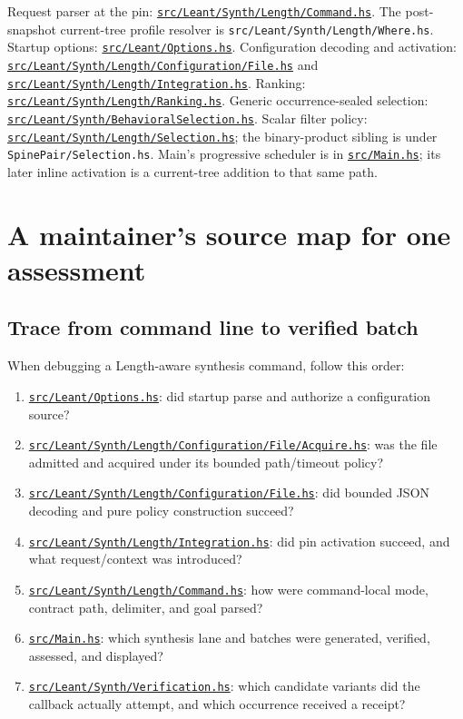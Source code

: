 \documentclass[10pt,letterpaper,oneside]{report}
\newcommand{\code}[1]{\texttt{\detokenize{#1}}}
\newcommand{\filepath}[1]{\nolinkurl{#1}}
\def\LeantCommit{494259dbd85ae2e6749246b08377f44b2f9936ac}
\def\LeantBase{https://github.com/VladimirReshetnikov/Leant/blob/\LeantCommit/}
\newcommand{\lpath}[1]{\href{\LeantBase#1}{\nolinkurl{#1}}}
\begin{document}
\begin{sourcebox}
Request parser at the pin: \lpath{src/Leant/Synth/Length/Command.hs}. The
post-snapshot current-tree profile resolver is
\filepath{src/Leant/Synth/Length/Where.hs}. Startup options:
\lpath{src/Leant/Options.hs}. Configuration decoding and activation:
\lpath{src/Leant/Synth/Length/Configuration/File.hs} and
\lpath{src/Leant/Synth/Length/Integration.hs}. Ranking:
\lpath{src/Leant/Synth/Length/Ranking.hs}. Generic occurrence-sealed selection:
\lpath{src/Leant/Synth/BehavioralSelection.hs}. Scalar filter policy:
\lpath{src/Leant/Synth/Length/Selection.hs}; the binary-product sibling is
under \filepath{SpinePair/Selection.hs}. Main's progressive scheduler is in
\lpath{src/Main.hs}; its later inline activation is a current-tree addition to
that same path.
\end{sourcebox}

\chapter{A maintainer's source map for one assessment}
\label{chap:current-source-map}

\section{Trace from command line to verified batch}

When debugging a Length-aware synthesis command, follow this order:

\begin{enumerate}
\item \lpath{src/Leant/Options.hs}: did startup parse and authorize a configuration source?
\item \lpath{src/Leant/Synth/Length/Configuration/File/Acquire.hs}: was the file admitted and acquired under its bounded path/timeout policy?
\item \lpath{src/Leant/Synth/Length/Configuration/File.hs}: did bounded JSON decoding and pure policy construction succeed?
\item \lpath{src/Leant/Synth/Length/Integration.hs}: did pin activation succeed, and what request/context was introduced?
\item \lpath{src/Leant/Synth/Length/Command.hs}: how were command-local mode, contract path, delimiter, and goal parsed?
\item \lpath{src/Main.hs}: which synthesis lane and batches were generated, verified, assessed, and displayed?
\item \lpath{src/Leant/Synth/Verification.hs}: which candidate variants did the callback actually attempt, and which occurrence received a \code{Verified} receipt?
\end{enumerate}
\end{document}
